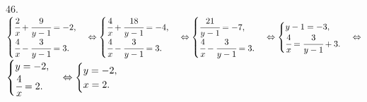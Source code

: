 46. $\begin{cases} \cfrac{2}{x}+\cfrac{9}{y-1}=-2,\\ \cfrac{4}{x}- \cfrac{3}{y-1}=3. \end{cases}\Leftrightarrow
\begin{cases} \cfrac{4}{x}+\cfrac{18}{y-1}=-4,\\ \cfrac{4}{x}- \cfrac{3}{y-1}=3. \end{cases}\Leftrightarrow
\begin{cases} \cfrac{21}{y-1}=-7,\\ \cfrac{4}{x}- \cfrac{3}{y-1}=3. \end{cases}\Leftrightarrow
\begin{cases} y-1=-3,\\ \cfrac{4}{x}=\cfrac{3}{y-1}+3. \end{cases}\Leftrightarrow$\\$
\begin{cases} y=-2,\\ \cfrac{4}{x}=2. \end{cases}\Leftrightarrow
\begin{cases} y=-2,\\ x=2. \end{cases}$\\
